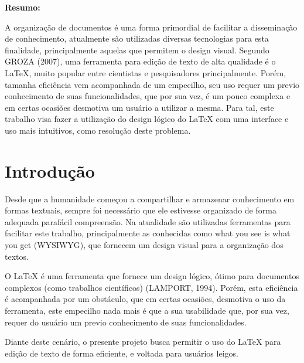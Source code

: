\documentclass[article,12pt,oneside,a4paper,english,brazil,sumario=tradicional]{abntex2}
\begin{document}
\begin{footnotesize}
\SingleSpacing
\noindent
\small{\textbf{Resumo:}}
\noindent
\small

A organização de documentos é uma forma primordial de facilitar a disseminação de conhecimento, 
	atualmente são utilizadas diversas tecnologias para esta finalidade, principalmente aquelas que permitem o design visual. 
	Segundo GROZA (2007), uma ferramenta para edição de texto de alta qualidade é o LaTeX, muito popular entre cientistas 
	e pesquisadores principalmente. Porém, tamanha eficiência vem acompanhada de um empecilho, seu uso requer um previo 
	conhecimento de suas funcionalidades, que por sua vez, é um pouco complexa e em certas ocasiões desmotiva um usuário a 
	utilizar a mesma. Para tal, este trabalho visa fazer a utilização do design lógico do LaTeX com uma interface e uso mais 
	intuitivos, como resolução deste problema.











\textual
\pagestyle{simple}

\section{Introdução}
\label{secIntroducao}
\normalsize

Desde que a humanidade começou a compartilhar e armazenar conhecimento em formas textuais, 
	sempre foi necessário que ele estivesse organizado de forma adequada parafácil compreensão. 
	Na atualidade são utilizadas ferramentas para facilitar este trabalho, principalmente as conhecidas 
	como what you see is what you get (WYSIWYG), que fornecem um design visual para a organização dos textos.

O LaTeX é uma ferramenta que fornece um design lógico, ótimo para documentos complexos (como trabalhos científicos) 
	(LAMPORT, 1994). Porém, esta eficiência é acompanhada por um obstáculo, que em certas ocasiões, desmotiva o uso
	 da ferramenta, este empecilho nada mais é que a sua usabilidade que, por sua vez, requer do usuário 
	 um previo conhecimento de suas funcionalidades.

Diante deste cenário, o presente projeto busca permitir o uso do LaTeX para edição de texto de forma eficiente, 
e voltada para usuários leigos.






\end{footnotesize}
\end{document}

